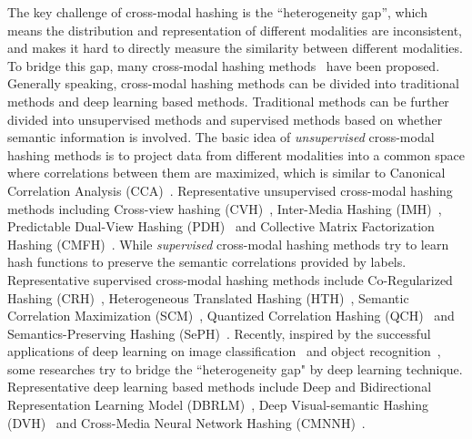 \documentclass[journal]{IEEEtran}
\begin{document}
The key challenge of cross-modal hashing is the ``heterogeneity gap'', which means the distribution and representation of different modalities are inconsistent, and makes it hard to directly measure the similarity between different modalities. To bridge this gap, many cross-modal hashing methods~\cite{cvh,imh,pdh,cmfh,CRH,HTH,SCM,QCH,SePH,DBRLM
,DMHOR,CMNNH,DVH,CAH} have been proposed. Generally speaking, cross-modal hashing methods can be divided into traditional methods and deep learning based methods. Traditional methods can be further divided into unsupervised methods and supervised methods based on whether semantic information is involved. The basic idea of \textit{unsupervised} cross-modal hashing methods is to project data from different modalities into a common space where correlations between them are maximized, which is similar to Canonical Correlation Analysis (CCA)~\cite{cca}. Representative unsupervised cross-modal hashing methods including Cross-view hashing (CVH)~\cite{cvh}, Inter-Media Hashing (IMH)~\cite{imh}, Predictable Dual-View Hashing (PDH)~\cite{pdh} and Collective Matrix Factorization Hashing (CMFH)~\cite{cmfh}. While \textit{supervised} cross-modal hashing methods try to learn hash functions to preserve the semantic correlations provided by labels. Representative supervised cross-modal hashing methods include Co-Regularized Hashing (CRH)~\cite{CRH}, Heterogeneous Translated Hashing (HTH)~\cite{HTH}, Semantic Correlation Maximization (SCM)~\cite{SCM}, Quantized Correlation Hashing (QCH)~\cite{QCH} and Semantics-Preserving Hashing (SePH)~\cite{SePH}. Recently, inspired by the successful applications of deep learning on image classification~\cite{imagelcass} and object recognition~\cite{deepobj}, some researches try to bridge the ``heterogeneity gap" by deep learning technique. Representative deep learning based methods include Deep and Bidirectional Representation Learning Model (DBRLM)~\cite{DBRLM}, Deep Visual-semantic Hashing (DVH)~\cite{DVH} and Cross-Media Neural Network Hashing (CMNNH)~\cite{CMNNH}.
\end{document}
